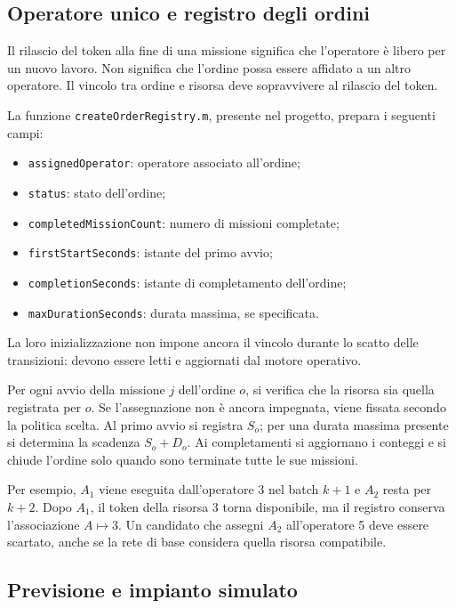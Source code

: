 \documentclass[a4paper,11pt]{article}
\begin{document}
\subsection{Operatore unico e registro degli ordini}

Il rilascio del token alla fine di una missione significa che l'operatore è libero per un nuovo lavoro. Non significa che l'ordine possa essere affidato a un altro operatore. Il vincolo tra ordine e risorsa deve sopravvivere al rilascio del token.

La funzione \texttt{createOrderRegistry.m}, presente nel progetto, prepara i seguenti campi:
\begin{itemize}
    \item \texttt{assignedOperator}: operatore associato all'ordine;
    \item \texttt{status}: stato dell'ordine;
    \item \texttt{completedMissionCount}: numero di missioni completate;
    \item \texttt{firstStartSeconds}: istante del primo avvio;
    \item \texttt{completionSeconds}: istante di completamento dell'ordine;
    \item \texttt{maxDurationSeconds}: durata massima, se specificata.
\end{itemize}
La loro inizializzazione non impone ancora il vincolo durante lo scatto delle transizioni: devono essere letti e aggiornati dal motore operativo.

Per ogni avvio della missione $j$ dell'ordine $o$, si verifica che la risorsa sia quella registrata per $o$. Se l'assegnazione non è ancora impegnata, viene fissata secondo la politica scelta. Al primo avvio si registra $S_o$; per una durata massima presente si determina la scadenza $S_o+D_o$. Ai completamenti si aggiornano i conteggi e si chiude l'ordine solo quando sono terminate tutte le sue missioni.

Per esempio, $A_1$ viene eseguita dall'operatore 3 nel batch $k+1$ e $A_2$ resta per $k+2$. Dopo $A_1$, il token della risorsa 3 torna disponibile, ma il registro conserva l'associazione $A\mapsto3$. Un candidato che assegni $A_2$ all'operatore 5 deve essere scartato, anche se la rete di base considera quella risorsa compatibile.

\subsection{Previsione e impianto simulato}
\end{document}
